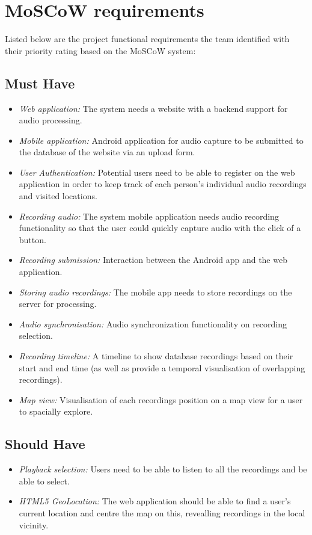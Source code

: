\documentclass{l3proj}
\begin{document}
\section{MoSCoW requirements}
Listed below are the project functional requirements the team identified with their priority rating based on the MoSCoW system:

\subsection{Must Have}
	\begin{itemize}
	\item{ \textit{Web application:} The system needs a website with a backend support for audio processing.}
	\item{ \textit{Mobile application:} Android application for audio capture to be submitted to the database of the website via an upload form.}
	\item{ \textit{User Authentication:} Potential users need to be able to register on the web application in order to keep track of each person's individual audio recordings and visited locations.}
	\item{ \textit{Recording audio:} The system mobile application needs audio recording functionality so that the user could quickly capture audio with the click of a button.}
	\item{ \textit{Recording submission:} Interaction between the Android app and the web application.}
	\item{ \textit{Storing audio recordings:} The mobile app needs to store recordings on the server for processing.}
	\item{ \textit{Audio synchronisation:} Audio synchronization functionality on recording selection.}
	\item{ \textit{Recording timeline:} A timeline to show database recordings based on their start and end time (as well as provide a temporal visualisation of overlapping recordings).}
	\item{ \textit{Map view:} Visualisation of each recordings position on a map view for a user to spacially explore.}
	\end{itemize}

\subsection{Should Have}
	\begin{itemize}
	\item{ \textit{Playback selection:} Users need to be able to listen to all the recordings and be able to select.}
	\item{ \textit{HTML5 GeoLocation:} The web application should be able to find a user's current location and centre the map on this, revealling recordings in the local vicinity.}
	\end{itemize}
\end{document}
